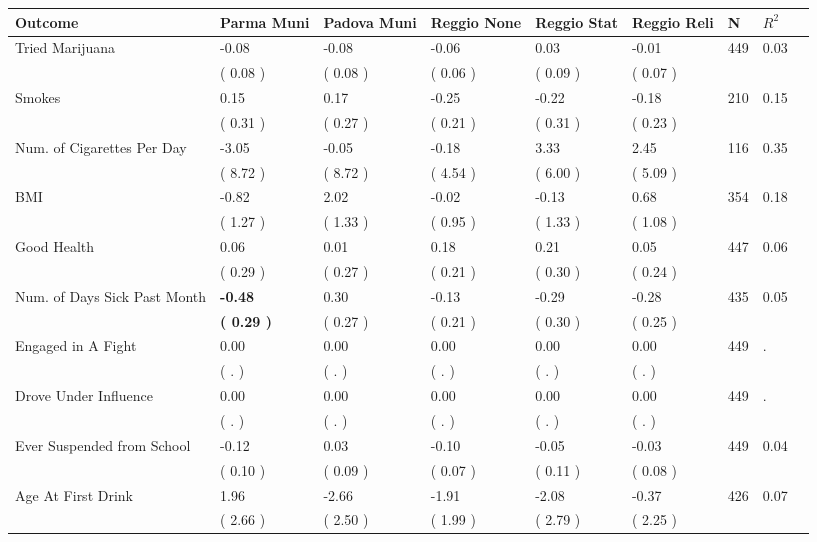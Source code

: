 \begin{tabular}{L{6.2cm} C{1.8cm} C{1.8cm} C{1.8cm} C{1.8cm} C{1.8cm} C{1.8cm} C{0.3cm} C{0.3cm}}
\toprule
 \textbf{Outcome} & \textbf{Parma Muni} & \textbf{Padova Muni} & \textbf{Reggio None} & \textbf{Reggio Stat} & \textbf{Reggio Reli} & \textbf{N} & \textbf{$ R^2$} \\
\midrule
Tried Marijuana &     -0.08 &     -0.08 &     -0.06 &      0.03 &     -0.01  & 449 &       0.03 \\ 
 & (     0.08 ) & (     0.08 ) & (     0.06 ) & (     0.09 ) & (     0.07 )  & \\
Smokes &      0.15 &      0.17 &     -0.25 &     -0.22 &     -0.18  & 210 &       0.15 \\ 
 & (     0.31 ) & (     0.27 ) & (     0.21 ) & (     0.31 ) & (     0.23 )  & \\
Num. of Cigarettes Per Day &     -3.05 &     -0.05 &     -0.18 &      3.33 &      2.45  & 116 &       0.35 \\ 
 & (     8.72 ) & (     8.72 ) & (     4.54 ) & (     6.00 ) & (     5.09 )  & \\
BMI &     -0.82 &      2.02 &     -0.02 &     -0.13 &      0.68  & 354 &       0.18 \\ 
 & (     1.27 ) & (     1.33 ) & (     0.95 ) & (     1.33 ) & (     1.08 )  & \\
Good Health &      0.06 &      0.01 &      0.18 &      0.21 &      0.05  & 447 &       0.06 \\ 
 & (     0.29 ) & (     0.27 ) & (     0.21 ) & (     0.30 ) & (     0.24 )  & \\
Num. of Days Sick Past Month & \textbf{    -0.48} &      0.30 &     -0.13 &     -0.29 &     -0.28  & 435 &       0.05 \\ 
 & \textbf{(     0.29 )} & (     0.27 ) & (     0.21 ) & (     0.30 ) & (     0.25 )  & \\
Engaged in A Fight &      0.00 &      0.00 &      0.00 &      0.00 &      0.00  & 449 &          . \\ 
 & (        . ) & (        . ) & (        . ) & (        . ) & (        . )  & \\
Drove Under Influence &      0.00 &      0.00 &      0.00 &      0.00 &      0.00  & 449 &          . \\ 
 & (        . ) & (        . ) & (        . ) & (        . ) & (        . )  & \\
Ever Suspended from School &     -0.12 &      0.03 &     -0.10 &     -0.05 &     -0.03  & 449 &       0.04 \\ 
 & (     0.10 ) & (     0.09 ) & (     0.07 ) & (     0.11 ) & (     0.08 )  & \\
Age At First Drink &      1.96 &     -2.66 &     -1.91 &     -2.08 &     -0.37  & 426 &       0.07 \\ 
 & (     2.66 ) & (     2.50 ) & (     1.99 ) & (     2.79 ) & (     2.25 )  & \\
\bottomrule
\end{tabular}
